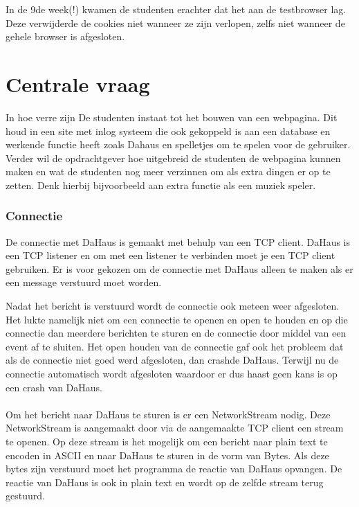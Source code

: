 \documentclass[11pt]{article}
\begin{document}
	In de 9de week(!) kwamen de studenten erachter dat het aan de testbrowser lag. Deze verwijderde de cookies niet wanneer ze zijn verlopen, zelfs niet wanneer de gehele browser is afgesloten.
	
\newpage
	
	\section{Centrale vraag}
	In hoe verre zijn De studenten instaat tot het bouwen van een webpagina. Dit houd in een site met inlog systeem die ook gekoppeld is aan een database en werkende functie heeft zoals Dahaus en spelletjes om te spelen voor de gebruiker. Verder wil de opdrachtgever hoe uitgebreid de studenten de webpagina kunnen maken en wat de studenten nog meer verzinnen om als extra dingen er op te zetten. Denk hierbij bijvoorbeeld aan extra functie als een muziek speler. 
	
	\newpage
	
	\subsubsection{Connectie}
	
	De connectie met DaHaus is gemaakt met behulp van een TCP client. DaHaus is een TCP listener en om met een listener te verbinden moet je een TCP client gebruiken. Er is voor gekozen om de connectie met DaHaus alleen te maken als er een message verstuurd moet worden.
	
	Nadat het bericht is verstuurd wordt de connectie ook meteen weer afgesloten. Het lukte namelijk niet om een connectie te openen en open te houden en op die connectie dan meerdere berichten te sturen en de connectie door middel van een event af te sluiten. Het open houden van de connectie gaf ook het probleem dat als de connectie niet goed werd afgesloten, dan crashde DaHaus. Terwijl nu de connectie automatisch wordt afgesloten waardoor er dus haast geen kans is op een crash van DaHaus.
	\\
	\\
	Om het bericht naar DaHaus te sturen is er een NetworkStream nodig.
	Deze NetworkStream is aangemaakt door via de aangemaakte TCP client een stream te openen. Op deze stream is het mogelijk om een bericht naar plain text te encoden in ASCII en naar DaHaus te sturen in de vorm van Bytes. Als deze bytes zijn verstuurd moet het programma de reactie van DaHaus opvangen. De reactie van DaHaus is ook in plain text en wordt op de zelfde stream terug gestuurd.
	
\end{document}

